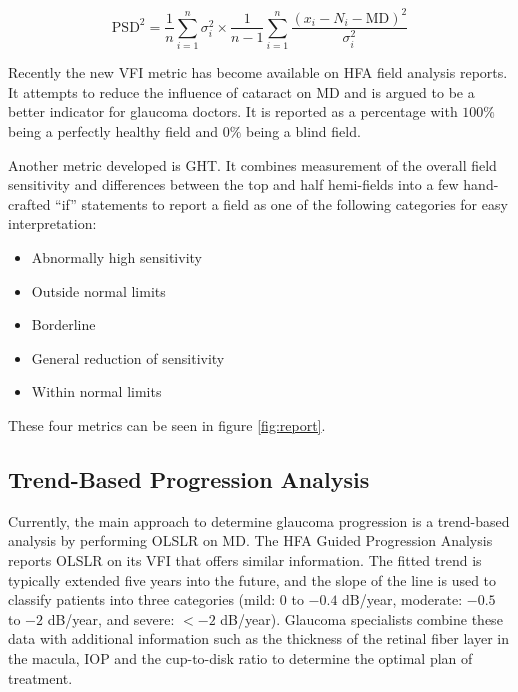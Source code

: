\begin{equation}
\textrm{PSD}^2 =
	\frac{1}{n}
	\sum\limits_{i=1}^{n} 
	\sigma_{i}^2
	\times
	\frac{1}{n-1}
	\sum\limits_{i=1}^{n} 
	\frac{(x_i-N_i-\textrm{MD})^2}{\sigma_{i}^2} 
\end{equation}

Recently the new \ac{VFI} metric has become available on \ac{HFA} field analysis reports. It attempts to reduce the influence of cataract on \ac{MD} and is argued to be a better indicator for glaucoma doctors. It is reported as a percentage with $100\%$ being a perfectly healthy field and $0\%$ being a blind field. \cite{Bengtsson2008}

Another metric developed is \ac{GHT}. It combines measurement of the overall field sensitivity and differences between the top and half hemi-fields into a few hand-crafted ``if'' statements to report a field as one of the following categories for easy interpretation: \cite{Asman1992}

\begin{itemize}
	\item Abnormally high sensitivity
	\item Outside normal limits
	\item Borderline
	\item General reduction of sensitivity
	\item Within normal limits
\end{itemize}

These four metrics can be seen in figure \ref{fig:report}.

\subsection{Trend-Based Progression Analysis}

Currently, the main approach to determine glaucoma progression is a trend-based analysis by performing \ac{OLSLR} on MD. The \ac{HFA} Guided Progression Analysis reports \ac{OLSLR} on its \ac{VFI} that offers similar information. The fitted trend is typically extended five years into the future, and the slope of the line is used to classify patients into three categories (mild: $0$ to $-0.4$ dB/year, moderate: $-0.5$ to $-2$ dB/year, and severe: $<-2$ dB/year). \cite{Chauhan2008} Glaucoma specialists combine these data with additional information such as the thickness of the retinal fiber layer in the macula, \ac{IOP} and the cup-to-disk ratio to determine the optimal plan of treatment. 

